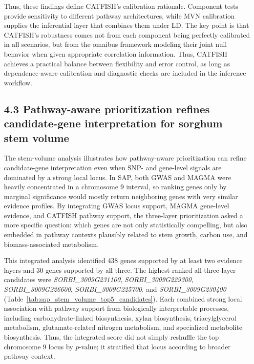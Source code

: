 \documentclass[unnumsec,webpdf,contemporary,large]{oup-authoring-template}%
\theoremstyle{thmstyleone}%
\theoremstyle{thmstyletwo}%
\theoremstyle{thmstylethree}%
\begin{document}
Thus, these findings define CATFISH’s calibration rationale. Component tests provide sensitivity to different pathway architectures, while MVN calibration supplies the inferential layer that combines them under LD. The key point is that CATFISH’s robustness comes not from each component being perfectly calibrated in all scenarios, but from the omnibus framework modeling their joint null behavior when given appropriate correlation information. Thus, CATFISH achieves a practical balance between flexibility and error control, as long as dependence-aware calibration and diagnostic checks are included in the inference workflow.


\subsection{4.3 Pathway-aware prioritization refines candidate-gene interpretation for sorghum stem volume}

The stem-volume analysis illustrates how pathway-aware prioritization can refine candidate-gene interpretation even when SNP- and gene-level signals are dominated by a strong local locus. In SAP, both GWAS and MAGMA were heavily concentrated in a chromosome 9 interval, so ranking genes only by marginal significance would mostly return neighboring genes with very similar evidence profiles. By integrating GWAS locus support, MAGMA gene-level evidence, and CATFISH pathway support, the three-layer prioritization asked a more specific question: which genes are not only statistically compelling, but also embedded in pathway contexts plausibly related to stem growth, carbon use, and biomass-associated metabolism.

This integrated analysis identified 438 genes supported by at least two evidence layers and 30 genes supported by all three. The highest-ranked all-three-layer candidates were \textit{SORBI\_3009G231100}, \textit{SORBI\_3009G229300}, \textit{SORBI\_3009G226600}, \textit{SORBI\_3009G225700}, and \textit{SORBI\_3009G230400} (Table~\ref{tab:sap_stem_volume_top5_candidates}). Each combined strong local association with pathway support from biologically interpretable processes, including carbohydrate-linked biosynthesis, xylan biosynthesis, triacylglycerol metabolism, glutamate-related nitrogen metabolism, and specialized metabolite biosynthesis. Thus, the integrated score did not simply reshuffle the top chromosome 9 locus by $p$-value; it stratified that locus according to broader pathway context.
\end{document}
